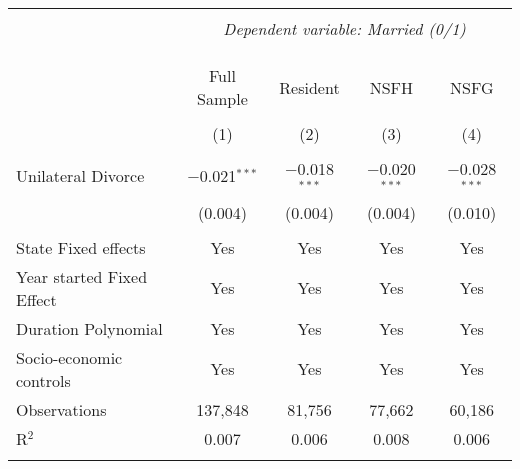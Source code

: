 
\begingroup 
\footnotesize 
\begin{tabular}{@{\extracolsep{5pt}}lcccc} 
\\[-1.8ex]\hline 
\hline \\[-1.8ex] 
 & \multicolumn{4}{c}{\textit{Dependent variable: Married (0/1)}} \\ 
\cline{2-5} 
\\[-1.8ex] &  &  &  & \\[-4.8ex] \\ 
 & Full Sample & Resident & NSFH & NSFG \\ 
\\[-1.8ex] & (1) & (2) & (3) & (4)\\ 
\hline \\[-1.8ex] 
 Unilateral Divorce & $-$0.021$^{***}$ & $-$0.018$^{***}$ & $-$0.020$^{***}$ & $-$0.028$^{***}$ \\ 
  & (0.004) & (0.004) & (0.004) & (0.010) \\ 
 \hline \\[-1.8ex] 
State Fixed effects & Yes & Yes & Yes & Yes \\ 
Year started Fixed Effect & Yes & Yes & Yes & Yes \\ 
Duration Polynomial & Yes & Yes & Yes & Yes \\ 
Socio-economic controls & Yes & Yes & Yes & Yes \\ 
Observations & 137,848 & 81,756 & 77,662 & 60,186 \\ 
R$^{2}$ & 0.007 & 0.006 & 0.008 & 0.006 \\ 
\hline 
\hline \\[-1.8ex] 
\end{tabular} 
\endgroup 
